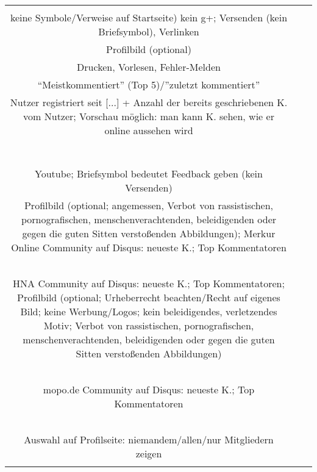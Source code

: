 \begin{landscape}
\begin{tabular}{ccc}
{		&
		\\
		keine Symbole/Verweise auf Startseite) kein g+; Versenden (kein Briefsymbol), Verlinken\\
		Profilbild (optional)\\
		Drucken, Vorlesen, Fehler-Melden\\
		``Meistkommentiert'' (Top 5)/''zuletzt kommentiert''\\
		Nutzer registriert seit [...] + Anzahl der bereits geschriebenen K. vom Nutzer; Vorschau möglich: man kann K. sehen, wie er online aussehen wird\\
		&
		\\
		\\
		\\
		\\
		\\
		\\
		&
		\\
		Youtube; Briefsymbol bedeutet Feedback geben (kein Versenden)\\
		Profilbild (optional; angemessen, Verbot von rassistischen, pornografischen, menschenverachtenden, beleidigenden oder gegen die guten Sitten verstoßenden Abbildungen); Merkur Online Community auf Disqus: neueste K.; Top Kommentatoren\\
		\\
		\\
		\\
		&
		\\
		\\
		HNA Community auf Disqus: neueste K.; Top Kommentatoren; Profilbild (optional; Urheberrecht beachten/Recht auf eigenes Bild; keine Werbung/Logos; kein beleidigendes, verletzendes Motiv; Verbot von rassistischen, pornografischen, menschenverachtenden, beleidigenden oder gegen die guten Sitten verstoßenden Abbildungen)\\
		\\
		\\
		\\
		&
		\\
		\\
		mopo.de Community auf Disqus: neueste K.; Top Kommentatoren\\
		\\
		\\
		\\
		&
		\\
		\\
		Auswahl auf Profilseite: niemandem/allen/nur Mitgliedern zeigen\\
}
\end{tabular}
\end{landscape}
